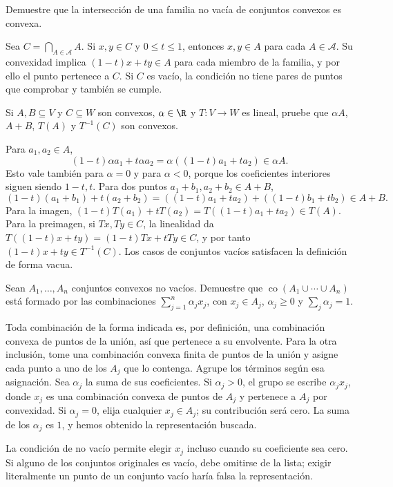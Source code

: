 \begin{ejercicio}\label{ej:lectura-24-1}
Demuestre que la intersección de una familia no vacía de conjuntos convexos es convexa.
\end{ejercicio}
\begin{solucion}
Sea $C=\bigcap_{A\in\mathcal A}A$. Si $x,y\in C$ y $0\leq t\leq1$, entonces $x,y\in A$ para cada $A\in\mathcal A$. Su convexidad implica $(1-t)x+ty\in A$ para cada miembro de la familia, y por ello el punto pertenece a $C$. Si $C$ es vacío, la condición no tiene pares de puntos que comprobar y también se cumple.
\end{solucion}

\begin{ejercicio}\label{ej:lectura-24-2}
Si $A,B\subseteq V$ y $C\subseteq W$ son convexos, $\alpha\in\R$ y $T:V\to W$ es lineal, pruebe que $\alpha A$, $A+B$, $T(A)$ y $T^{-1}(C)$ son convexos.
\end{ejercicio}
\begin{solucion}
Para $a_1,a_2\in A$,
\[
 (1-t)\alpha a_1+t\alpha a_2=\alpha((1-t)a_1+ta_2)\in\alpha A.
\]
Esto vale también para $\alpha=0$ y para $\alpha<0$, porque los coeficientes interiores siguen siendo $1-t,t$. Para dos puntos $a_1+b_1,a_2+b_2\in A+B$,
\[
 (1-t)(a_1+b_1)+t(a_2+b_2)
 =((1-t)a_1+ta_2)+((1-t)b_1+tb_2)\in A+B.
\]
Para la imagen, $(1-t)T(a_1)+tT(a_2)=T((1-t)a_1+ta_2)\in T(A)$. Para la preimagen, si $Tx,Ty\in C$, la linealidad da $T((1-t)x+ty)=(1-t)Tx+tTy\in C$, y por tanto $(1-t)x+ty\in T^{-1}(C)$. Los casos de conjuntos vacíos satisfacen la definición de forma vacua.
\end{solucion}

\begin{ejercicio}\label{ej:lectura-24-3}
Sean $A_1,\ldots,A_n$ conjuntos convexos no vacíos. Demuestre que $\operatorname{co}(A_1\cup\cdots\cup A_n)$ está formado por las combinaciones $\sum_{j=1}^n\alpha_jx_j$, con $x_j\in A_j$, $\alpha_j\geq0$ y $\sum_j\alpha_j=1$.
\end{ejercicio}
\begin{solucion}
Toda combinación de la forma indicada es, por definición, una combinación convexa de puntos de la unión, así que pertenece a su envolvente. Para la otra inclusión, tome una combinación convexa finita de puntos de la unión y asigne cada punto a uno de los $A_j$ que lo contenga. Agrupe los términos según esa asignación. Sea $\alpha_j$ la suma de sus coeficientes. Si $\alpha_j>0$, el grupo se escribe $\alpha_jx_j$, donde $x_j$ es una combinación convexa de puntos de $A_j$ y pertenece a $A_j$ por convexidad. Si $\alpha_j=0$, elija cualquier $x_j\in A_j$; su contribución será cero. La suma de los $\alpha_j$ es $1$, y hemos obtenido la representación buscada.

La condición de no vacío permite elegir $x_j$ incluso cuando su coeficiente sea cero. Si alguno de los conjuntos originales es vacío, debe omitirse de la lista; exigir literalmente un punto de un conjunto vacío haría falsa la representación.
\end{solucion}

